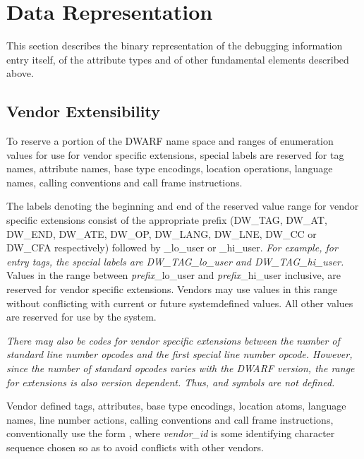 \chapter{Data Representation}
\label{datarep:datarepresentation}

This section describes the binary representation of the
debugging information entry itself, of the attribute types
and of other fundamental elements described above.


\section{Vendor Extensibility}
\label{datarep:vendorextensibility}

To 
reserve a portion of the DWARF name space and ranges of
enumeration values for use for vendor specific extensions,
special labels are reserved for tag names, attribute names,
base type encodings, location operations, language names,
calling conventions and call frame instructions.

The labels denoting the beginning and end of the reserved
value range for vendor specific extensions consist of the
appropriate prefix (DW\_TAG, DW\_AT, DW\_END, DW\_ATE, DW\_OP,
DW\_LANG, DW\_LNE, DW\_CC or DW\_CFA respectively) followed by
\hypertarget{chap:DWXXXlohiuser}{}
\_lo\_user or \_hi\_user. 
\textit{For example, for entry tags, the special
labels are DW\_TAG\_lo\_user and DW\_TAG\_hi\_user.}
Values in the  range between \textit{prefix}\_lo\_user 
and \textit{prefix}\_hi\_user inclusive,
are reserved for vendor specific extensions. Vendors may
use values in this range without conflicting with current or
future system\dash defined values. All other values are reserved
for use by the system.

\textit{There may also be codes for vendor specific extensions
between the number of standard line number opcodes and
the first special line number opcode. However, since the
number of standard opcodes varies with the DWARF version,
the range for extensions is also version dependent. Thus,
 and 
 symbols are not defined.
}

Vendor defined tags, attributes, base type encodings, location
atoms, language names, line number actions, calling conventions
and call frame instructions, conventionally use the form
, where 
\textit{vendor\_id} is some identifying
character sequence chosen so as to avoid conflicts with
other vendors.

